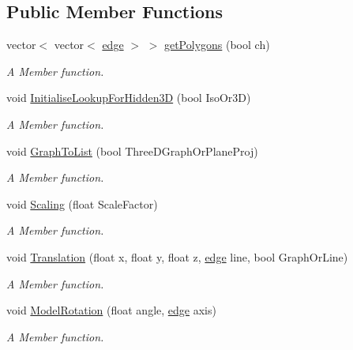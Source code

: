 \subsection*{Public Member Functions}
\begin{DoxyCompactItemize}
\item 
vector$<$ vector$<$ \hyperlink{structedge}{edge} $>$ $>$ \hyperlink{classThreeDGraph__class_a6bc32a5861610e120135f76383cbc8aa}{get\+Polygons} (bool ch)
\begin{DoxyCompactList}\small\item\em A Member function. \end{DoxyCompactList}\item 
void \hyperlink{classThreeDGraph__class_a132845f27333d0c2ead3a27bb4398a4d}{Initialise\+Lookup\+For\+Hidden3D} (bool Iso\+Or3D)
\begin{DoxyCompactList}\small\item\em A Member function. \end{DoxyCompactList}\item 
void \hyperlink{classThreeDGraph__class_a521cb31c72fa3828840a3bf4403e1395}{Graph\+To\+List} (bool Three\+D\+Graph\+Or\+Plane\+Proj)
\begin{DoxyCompactList}\small\item\em A Member function. \end{DoxyCompactList}\item 
void \hyperlink{classThreeDGraph__class_afa131e00002ddff96be961a903e2c589}{Scaling} (float Scale\+Factor)
\begin{DoxyCompactList}\small\item\em A Member function. \end{DoxyCompactList}\item 
void \hyperlink{classThreeDGraph__class_aa3f177ba316ff1fc411926ba9d08c80f}{Translation} (float x, float y, float z, \hyperlink{structedge}{edge} line, bool Graph\+Or\+Line)
\begin{DoxyCompactList}\small\item\em A Member function. \end{DoxyCompactList}\item 
void \hyperlink{classThreeDGraph__class_a400bececda29db8682455d92872f0a5e}{Model\+Rotation} (float angle, \hyperlink{structedge}{edge} axis)
\begin{DoxyCompactList}\small\item\em A Member function. \end{DoxyCompactList}\item 

\end{DoxyCompactItemize}
